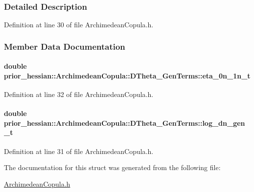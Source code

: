 \subsubsection{Detailed Description}


Definition at line 30 of file Archimedean\+Copula.\+h.



\subsubsection{Member Data Documentation}
\paragraph[{\texorpdfstring{eta\+\_\+0n\+\_\+1n\+\_\+t}{eta_0n_1n_t}}]{\setlength{\rightskip}{0pt plus 5cm}double prior\+\_\+hessian\+::\+Archimedean\+Copula\+::\+D\+Theta\+\_\+\+Gen\+Terms\+::eta\+\_\+0n\+\_\+1n\+\_\+t}\hypertarget{structprior__hessian_1_1ArchimedeanCopula_1_1DTheta__GenTerms_aad178f79e4a073efb684b19420a27644}{}\label{structprior__hessian_1_1ArchimedeanCopula_1_1DTheta__GenTerms_aad178f79e4a073efb684b19420a27644}


Definition at line 32 of file Archimedean\+Copula.\+h.

\paragraph[{\texorpdfstring{log\+\_\+dn\+\_\+gen\+\_\+t}{log_dn_gen_t}}]{\setlength{\rightskip}{0pt plus 5cm}double prior\+\_\+hessian\+::\+Archimedean\+Copula\+::\+D\+Theta\+\_\+\+Gen\+Terms\+::log\+\_\+dn\+\_\+gen\+\_\+t}\hypertarget{structprior__hessian_1_1ArchimedeanCopula_1_1DTheta__GenTerms_a53b2585e2895a634b563e6f7a27546db}{}\label{structprior__hessian_1_1ArchimedeanCopula_1_1DTheta__GenTerms_a53b2585e2895a634b563e6f7a27546db}


Definition at line 31 of file Archimedean\+Copula.\+h.



The documentation for this struct was generated from the following file\+:\begin{DoxyCompactItemize}
\item 
\hyperlink{ArchimedeanCopula_8h}{Archimedean\+Copula.\+h}\end{DoxyCompactItemize}
